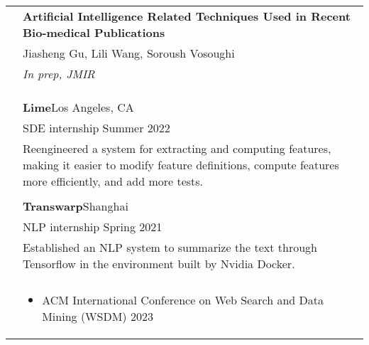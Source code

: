 \documentclass[letterpaper, 11pt]{article}
\begin{document}
\begin{longtable}{p{1.3in}p{4.8in}}
& \textbf{Artificial Intelligence Related Techniques Used in Recent Bio-medical Publications} \\
& Jiasheng Gu, Lili Wang, Soroush Vosoughi \\
& \textit{In prep, JMIR}\\
& \\


& \\


& \\


{\color{black}{Industry experience}} 
& {\textbf{Lime}}\hfill Los Angeles, CA \\
& SDE internship \hfill Summer 2022 \\
& Reengineered a system for extracting and computing features, making it easier to modify feature definitions, compute features more efficiently, and add more tests.\\
&\\

& {\textbf{Transwarp}}\hfill Shanghai\\
& NLP internship \hfill Spring 2021 \\
& Established an NLP system to summarize the text through Tensorflow in the environment built by Nvidia Docker.\\
& \\

\newline
{\color{black}{Professional service}}
&  \begin{itemize}[leftmargin=10pt, itemsep=-5pt, topsep=0pt]
    \item ACM International Conference on Web Search and Data Mining (WSDM) 2023
  \end{itemize}\\ 


\end{longtable}
\end{document}
